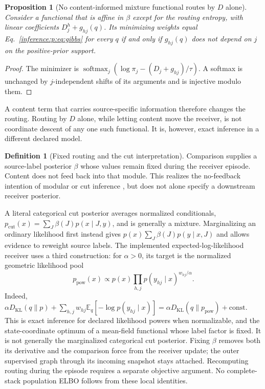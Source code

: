 \documentclass[11pt]{article}
\newtheorem{proposition}[theorem]{Proposition}
\theoremstyle{definition}
\newtheorem{definition}[theorem]{Definition}
\theoremstyle{remark}
\providecommand{\KL}{D_{\mathrm{KL}}}
\providecommand{\softmax}{\operatorname{softmax}}
\providecommand{\E}{\mathbb{E}}
\begin{document}
\begin{proposition}[No content-informed mixture functional routes by $D$ alone]
\label{inference:g:prop:no_D_only}
Consider a functional that is affine in $\beta$ except for the routing entropy, with linear coefficients $D_j^h+g_{hj}(q)$. Its minimizing weights equal Eq.~\eqref{inference:p:eq:gibbs} for every $q$ if and only if $g_{hj}(q)$ does not depend on $j$ on the positive-prior support.
\end{proposition}

\begin{proof}
The minimizer is $\softmax_j(\log\pi_j-(D_j+g_{hj})/\tau)$. A softmax is unchanged by $j$-independent shifts of its arguments and is injective modulo them.
\end{proof}

A content term that carries source-specific information therefore changes the routing. Routing by $D$ alone, while letting content move the receiver, is not coordinate descent of any one such functional. It is, however, exact inference in a different declared model.

\begin{definition}[Fixed routing and the cut interpretation]
\label{inference:g:def:cut}
Comparison supplies a source-label posterior $\beta$ whose values remain fixed during the receiver episode. Content does not feed back into that module. This realizes the no-feedback intention of modular or cut inference \citep{inference:plummer2015cuts,inference:jacob2017modules}, but does not alone specify a downstream receiver posterior.
\end{definition}
A literal categorical cut posterior averages normalized conditionals, $p_{\mathrm{cut}}(x)=\sum_J\beta(J)p(x\mid J,y)$, and is generally a mixture. Marginalizing an ordinary likelihood first instead gives $p(x)\sum_J\beta(J)p(y\mid x,J)$ and allows evidence to reweight source labels. The implemented expected-log-likelihood receiver uses a third construction: for $\alpha>0$, its target is the normalized geometric likelihood pool
\begin{equation}
p_{\mathrm{pow}}(x)\propto p(x)\prod_{h,j}p(y_{hj}\mid x)^{w_{hj}/\alpha}.
\label{inference:g:eq:power_posterior}
\end{equation}
Indeed, $\alpha\KL(q\|p)+\sum_{h,j}w_{hj}\E_q[-\log p(y_{hj}\mid x)]=\alpha\KL(q\|p_{\mathrm{pow}})+\text{const}$. This is exact inference for declared likelihood powers when normalizable, and the state-coordinate optimum of a mean-field functional whose label factor is fixed. It is not generally the marginalized categorical cut posterior. Fixing $\beta$ removes both its derivative and the comparison force from the receiver update; the outer supervised graph through its incoming snapshot stays attached. Recomputing routing during the episode requires a separate objective argument. No complete-stack population ELBO follows from these local identities.
\end{document}
